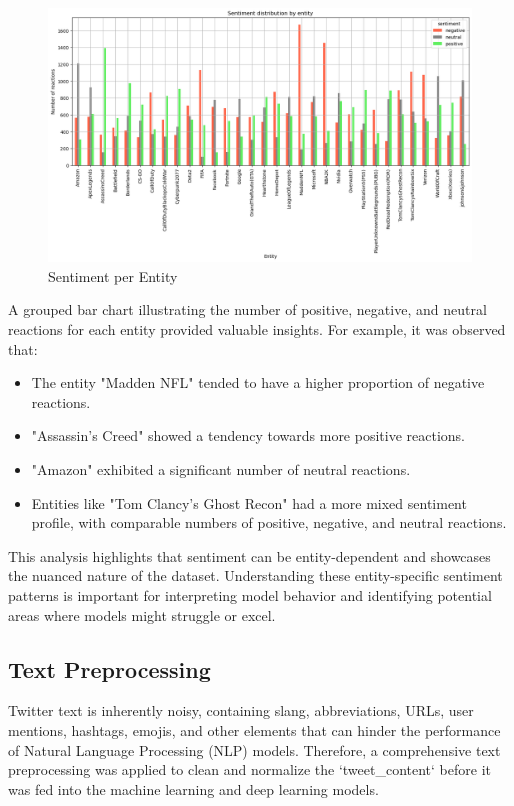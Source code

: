 \begin{figure}[h!]
    \centering
    \includegraphics[width=1\linewidth]{images/sentiment_per_entity.png}
    \caption{Sentiment per Entity}
    \label{fig:sentiment_per_entity}
\end{figure}

A grouped bar chart illustrating the number of positive, negative, and neutral reactions for each entity provided valuable insights. For example, it was observed that:
\begin{itemize}
    \item The entity "Madden NFL" tended to have a higher proportion of negative reactions.
    \item "Assassin's Creed" showed a tendency towards more positive reactions.
    \item "Amazon" exhibited a significant number of neutral reactions.
    \item Entities like "Tom Clancy's Ghost Recon" had a more mixed sentiment profile, with comparable numbers of positive, negative, and neutral reactions.
\end{itemize}

This analysis highlights that sentiment can be entity-dependent and showcases the nuanced nature of the dataset. Understanding these entity-specific sentiment patterns is important for interpreting model behavior and identifying potential areas where models might struggle or excel.

\subsection{Text Preprocessing}

Twitter text is inherently noisy, containing slang, abbreviations, URLs, user mentions, hashtags, emojis, and other elements that can hinder the performance of Natural Language Processing (NLP) models. Therefore, a comprehensive text preprocessing was applied to clean and normalize the `tweet\_content` before it was fed into the machine learning and deep learning models.

